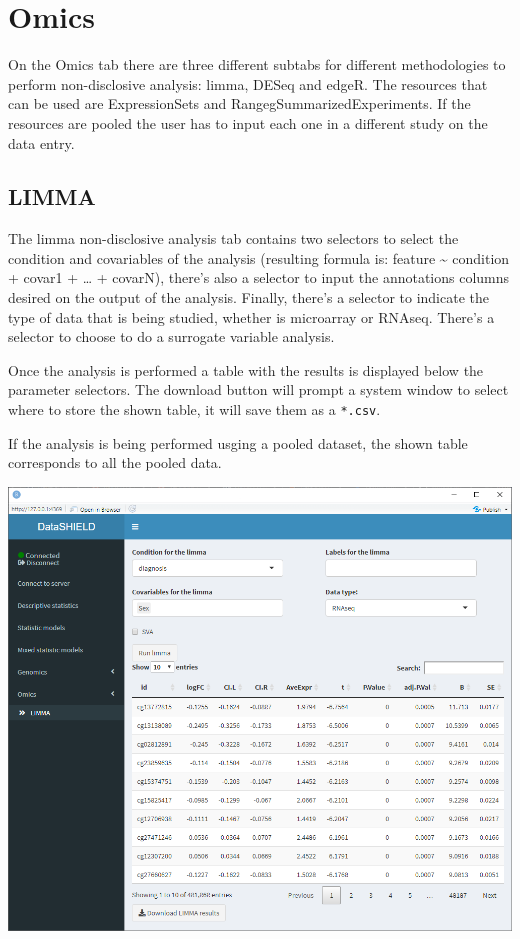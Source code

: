 \documentclass[
]{book}
\begin{document}
\hypertarget{omics}{%
\section{Omics}\label{omics}}

On the Omics tab there are three different subtabs for different methodologies to perform non-disclosive analysis: limma, DESeq and edgeR. The resources that can be used are ExpressionSets and RangegSummarizedExperiments. If the resources are pooled the user has to input each one in a different study on the data entry.

\hypertarget{limma}{%
\subsection{LIMMA}\label{limma}}

The limma non-disclosive analysis tab contains two selectors to select the condition and covariables of the analysis (resulting formula is: feature \textasciitilde{} condition + covar1 + \ldots{} + covarN), there's also a selector to input the annotations columns desired on the output of the analysis. Finally, there's a selector to indicate the type of data that is being studied, whether is microarray or RNAseq. There's a selector to choose to do a surrogate variable analysis.

Once the analysis is performed a table with the results is displayed below the parameter selectors. The download button will prompt a system window to select where to store the shown table, it will save them as a \texttt{*.csv}.

If the analysis is being performed usging a pooled dataset, the shown table corresponds to all the pooled data.

\includegraphics{images/omics1.png}
\end{document}
